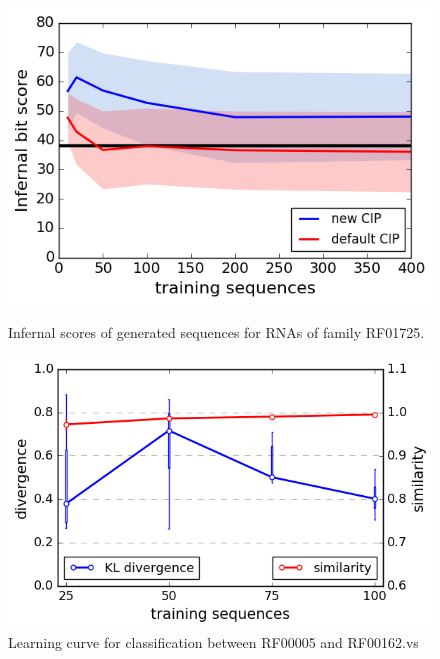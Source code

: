 \documentclass{article}
\begin{document}
\begin{figure}[ht]
      \centering
  \begin{minipage}[b]{0.47\textwidth}
    \includegraphics[width=\textwidth]{images/infernal_abstr.png}
    \caption{Infernal scores of generated sequences for RNAs of family RF01725.}
      \label{infeval}
  \end{minipage}
  \hfill
  \begin{minipage}[b]{0.52\textwidth}
    \includegraphics[width=\textwidth]{images/learningcurve.png}
    \caption{Learning curve for classification between RF00005 and RF00162.vs}
     \label{learncurve}
  \end{minipage}
\end{figure}


\end{document}
